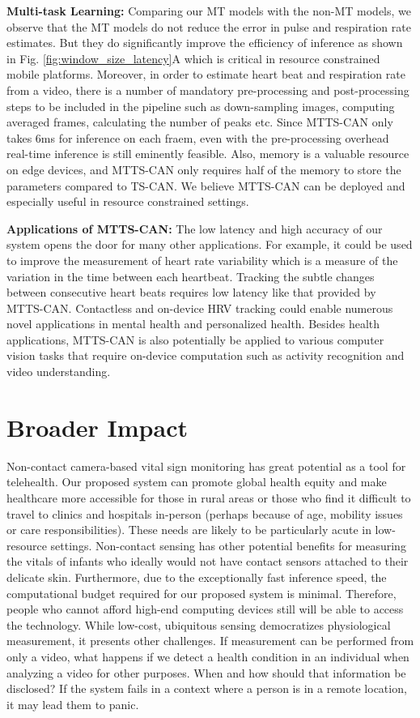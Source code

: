 \documentclass{article}
\begin{document}
\textbf{Multi-task Learning:}
Comparing our MT models with the non-MT models, we observe that the MT models do not reduce the error in pulse and respiration rate estimates. But they do significantly improve the efficiency of inference as shown in Fig. \ref{fig:window_size_latency}A which is critical in resource constrained mobile platforms. Moreover, in order to estimate heart beat and respiration rate from a video, there is a number of mandatory pre-processing and post-processing steps to be included in the pipeline such as down-sampling images, computing averaged frames, calculating the number of peaks etc. Since MTTS-CAN only takes 6ms for inference on each fraem, even with the pre-processing overhead real-time inference is still eminently feasible. Also, memory is a valuable resource on edge devices, and MTTS-CAN only requires half of the memory to store the parameters compared to TS-CAN. We believe MTTS-CAN can be deployed and especially useful in resource constrained settings. 

\textbf{Applications of MTTS-CAN:}
The low latency and high accuracy of our system opens the door for many other applications. For example, it could be used to improve the measurement of heart rate variability which is a measure of the variation in the time between each heartbeat. Tracking the subtle changes between consecutive heart beats requires low latency like that provided by MTTS-CAN. Contactless and on-device HRV tracking could enable numerous novel applications in mental health and personalized health. Besides health applications, MTTS-CAN is also potentially be applied to various computer vision tasks that require on-device computation such as activity recognition and video understanding. 



\section{Broader Impact}

Non-contact camera-based vital sign monitoring has great potential as a tool for telehealth. Our proposed system can promote global health equity and make healthcare more accessible for those in rural areas or those who find it difficult to travel to clinics and hospitals in-person (perhaps because of age, mobility issues or care responsibilities). These needs are likely to be particularly acute in low-resource settings. Non-contact sensing has other potential benefits for measuring the vitals of infants who ideally would not have contact sensors attached to their delicate skin. Furthermore, due to the exceptionally fast inference speed, the computational budget required for our proposed system is minimal. Therefore, people who cannot afford high-end computing devices still will be able to access the technology. While low-cost, ubiquitous sensing democratizes physiological measurement, it presents other challenges. If measurement can be performed from only a video, what happens if we detect a health condition in an individual when analyzing a video for other purposes. When and how should that information be disclosed? If the system fails in a context where a person is in a remote location, it may lead them to panic. 
\end{document}
